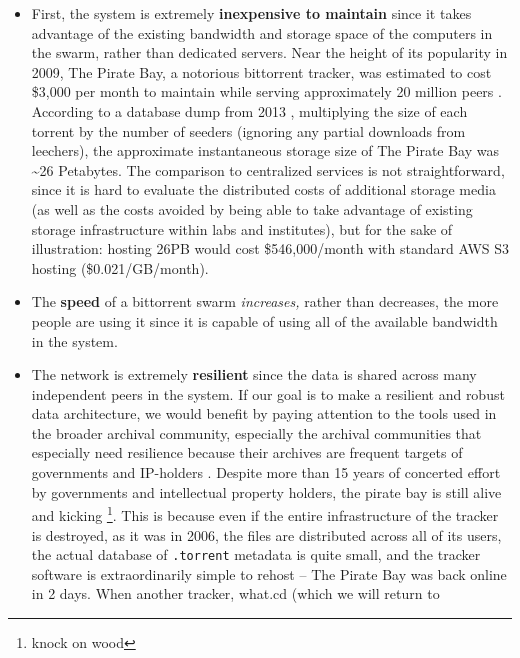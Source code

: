 \documentclass[10pt]{tufte-book}
\begin{document}
\begin{itemize}

\item
  First, the system is extremely \textbf{inexpensive to maintain} since
  it takes advantage of the existing bandwidth and storage space of the
  computers in the swarm, rather than dedicated servers. Near the height
  of its popularity in 2009, The Pirate Bay, a notorious bittorrent
  tracker, was estimated to cost \$3,000 per month to maintain while
  serving approximately 20 million peers \citep{roettgersPirateBayDistributing2009} . According to a database dump
  from 2013 \citep{PirateBayArchiveteam2020} , multiplying the
  size of each torrent by the number of seeders (ignoring any partial
  downloads from leechers), the approximate instantaneous storage size
  of The Pirate Bay was \textasciitilde26 Petabytes. The comparison to
  centralized services is not straightforward, since it is hard to
  evaluate the distributed costs of additional storage media (as well as
  the costs avoided by being able to take advantage of existing storage
  infrastructure within labs and institutes), but for the sake of
  illustration: hosting 26PB would cost \$546,000/month with standard
  AWS S3 hosting (\$0.021/GB/month).
\item
  The \textbf{speed} of a bittorrent swarm \emph{increases,} rather than
  decreases, the more people are using it since it is capable of using
  all of the available bandwidth in the system.
\item
  The network is extremely \textbf{resilient} since the data is shared
  across many independent peers in the system. If our goal is to make a
  resilient and robust data architecture, we would benefit by paying
  attention to the tools used in the broader archival community,
  especially the archival communities that especially need resilience
  because their archives are frequent targets of governments and
  IP-holders\citep{spiesDataIntegrityLibrarians2017} . Despite
  more than 15 years of concerted effort by governments and intellectual
  property holders, the pirate bay is still alive and kicking \citep{kim15YearsPirate2019} \footnote{knock on wood}. This is because
  even if the entire infrastructure of the tracker is destroyed, as it
  was in 2006, the files are distributed across all of its users, the
  actual database of \texttt{.torrent} metadata is quite small, and the
  tracker software is extraordinarily simple to rehost \citep{vandersarOpenBayNow2014}  -- The Pirate Bay was back online in 2
  days. When another tracker, what.cd (which we will return to

\end{itemize}
\end{document}
